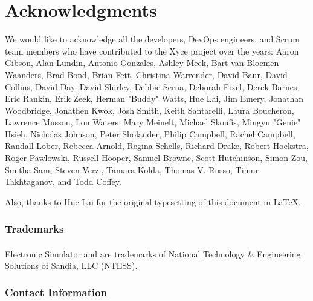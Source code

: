 


\chapter*{Acknowledgments}

We would like to acknowledge all the developers, DevOps engineers, and Scrum
team members who have contributed to the Xyce project over the years: 
Aaron Gibson,
Alan Lundin,
Antonio Gonzales,
Ashley Meek,
Bart van Bloemen Waanders,
Brad Bond,
Brian Fett,
Christina Warrender,
David Baur,
David Collins,
David Day,
David Shirley,
Debbie Serna,
Deborah Fixel,
Derek Barnes,
Eric Rankin,
Erik Zeek,
Herman "Buddy" Watts,
Hue Lai,
Jim Emery,
Jonathan Woodbridge,
Jonathen Kwok,
Josh Smith,
Keith Santarelli,
Laura Boucheron,
Lawrence Musson,
Lon Waters,
Mary Meinelt,
Michael Skoufis,
Mingyu \mbox{"Genie"} Hsieh,
Nicholas Johnson,
Peter Sholander,
Philip Campbell,
Rachel Campbell,
Randall Lober,
Rebecca Arnold,
Regina Schells,
Richard Drake,
Robert Hoekstra,
Roger Pawlowski,
Russell Hooper,
Samuel Browne,
Scott Hutchinson,
Simon Zou,
Smitha Sam,
Steven Verzi,
Tamara Kolda,
Thomas V. Russo,
Timur Takhtaganov, and
Todd Coffey.

\noindent
Also, thanks to Hue Lai for the original typesetting of this document in \LaTeX.

\subsection*{Trademarks}

\Xyce{} Electronic Simulator\textsuperscript{\scriptsize{\texttrademark}} and
\XyceTM{} are trademarks of National Technology \& Engineering Solutions of
Sandia, LLC (NTESS).

\subsection*{Contact Information} \label{Contact Information}

